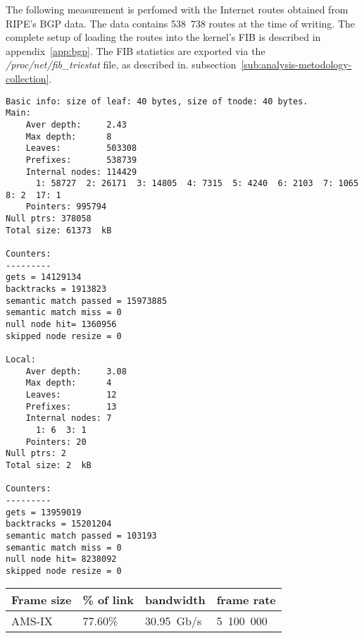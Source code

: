 
The following measurement is perfomed with the Internet routes obtained from RIPE's BGP data.
The data contains 538~738 routes at the time of writing.
The complete setup of loading the routes into the kernel's FIB is described in appendix~\ref{app:bgp}.
The FIB statistics are exported via the {\it{/proc/net/fib\_triestat}} file, as described in.
subsection~\ref{sub:analysis-metodology-collection}.
\begin{lstlisting}
Basic info: size of leaf: 40 bytes, size of tnode: 40 bytes.
Main:
	Aver depth:     2.43
	Max depth:      8
	Leaves:         503308
	Prefixes:       538739
	Internal nodes: 114429
	  1: 58727  2: 26171  3: 14805  4: 7315  5: 4240  6: 2103  7: 1065  8: 2  17: 1
	Pointers: 995794
Null ptrs: 378058
Total size: 61373  kB

Counters:
---------
gets = 14129134
backtracks = 1913823
semantic match passed = 15973885
semantic match miss = 0
null node hit= 1360956
skipped node resize = 0

Local:
	Aver depth:     3.08
	Max depth:      4
	Leaves:         12
	Prefixes:       13
	Internal nodes: 7
	  1: 6  3: 1
	Pointers: 20
Null ptrs: 2
Total size: 2  kB

Counters:
---------
gets = 13959019
backtracks = 15201204
semantic match passed = 103193
semantic match miss = 0
null node hit= 8238092
skipped node resize = 0
\end{lstlisting}

\begin{tabular}{ | l | l | l | l | }
\hline
Frame size & \% of link & bandwidth & frame rate \\
\hline
AMS-IX & 77.60\% &  30.95~Gb/s & 5~100~000 \\
\hline
\end{tabular}

